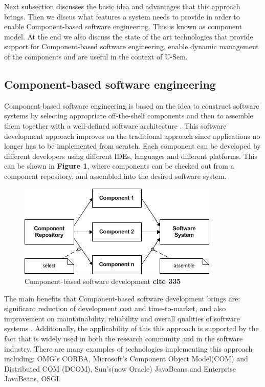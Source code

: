Next subsection discusses the basic idea and advantages that this approach brings. Then we discus what features a system needs to provide in order to enable Component-based software engineering. This is known as component model. At the end we also discuss the state of the art technologies that provide support for Component-based software engineering, enable dynamic management of the components and are useful in the context of U-Sem. 

\subsection{Component-based software engineering}

Component-based software engineering is based on the idea to construct software systems by selecting appropriate off-the-shelf components and then to assemble them together with a well-defined software architecture \cite{Pour}. This software development approach improves on the traditional approach since applications no longer has to be implemented from scratch. Each component can be developed by different developers using different IDEs, languages and different platforms. This can be shown in \textbf{Figure 1}, where components can be checked out from a component repository, and assembled into the desired software system.

\begin{figure}[h!]
  \centering
  	\includegraphics[scale=0.75]{plug-in/component-based.png}
  \caption{Component-based software development \textbf{cite 335} }
\end{figure}

The main benefits that Component-based software development brings are: significant reduction of development cost and time-to-market, and also improvement on maintainability, reliability and overall qualities of software systems \cite{Pour1} \cite{Pour2}. Additionally, the applicability of this this approach is supported by the fact that is widely used in both the research community and in the software industry. There are many examples of technologies implementing this approach including: OMG's CORBA,  Microsoft's Component Object Model(COM) and Distributed COM (DCOM), Sun's(now Oracle) JavaBeans and Enterprise JavaBeans, OSGI.

